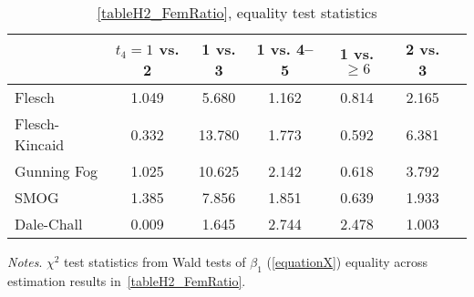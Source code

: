 \begin{table}[H]
    \footnotesize
    \centering
    \begin{threeparttable}
        \caption{\autoref{tableH2_FemRatio}, equality test statistics}
        \label{tableH3}
        \begin{tabular}{p{3cm}S@{}S@{}S@{}S@{}S@{}S@{}}
            \toprule
            &{\(t_4=1\) vs. 2}&{1 vs. 3}&{1 vs. 4--5}&{1 vs. \(\ge6\)}&{2 vs. 3}\\
            \midrule
            Flesch              &       1.049&       5.680&       1.162&       0.814&       2.165\\
            Flesch-Kincaid      &       0.332&      13.780&       1.773&       0.592&       6.381\\
            Gunning Fog         &       1.025&      10.625&       2.142&       0.618&       3.792\\
            SMOG                &       1.385&       7.856&       1.851&       0.639&       1.933\\
            Dale-Chall          &       0.009&       1.645&       2.744&       2.478&       1.003\\
            \bottomrule
        \end{tabular}
        \begin{tablenotes}
            \tiny
            \item \textit{Notes}. \(\chi^2\) test statistics from Wald tests of \(\beta_1\) (\autoref{equationX}) equality across estimation results in~\autoref{tableH2_FemRatio}.
        \end{tablenotes}
    \end{threeparttable}
\end{table}